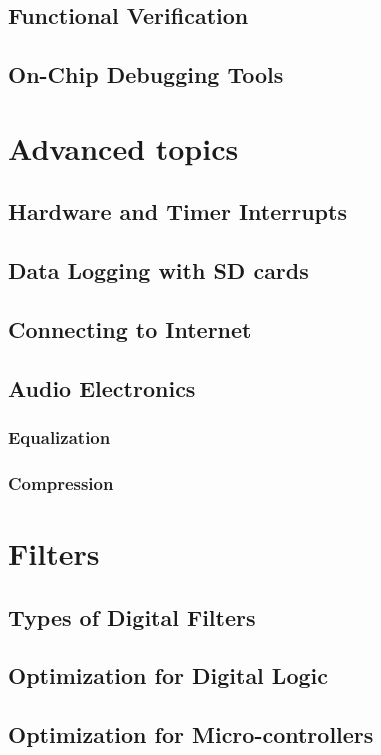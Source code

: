 \documentclass[]{book}
\begin{document}
\section{Functional Verification}
\section{On-Chip Debugging Tools}

\chapter{Advanced topics}
\section{Hardware and Timer Interrupts}
\section{Data Logging with SD cards}
\section{Connecting to Internet}
\section{Audio Electronics}
\subsection{Equalization}
\subsection{Compression}
	
\chapter{Filters}
\section{Types of Digital Filters}
\section{Optimization for Digital Logic}
\section{Optimization for Micro-controllers}
\end{document}
